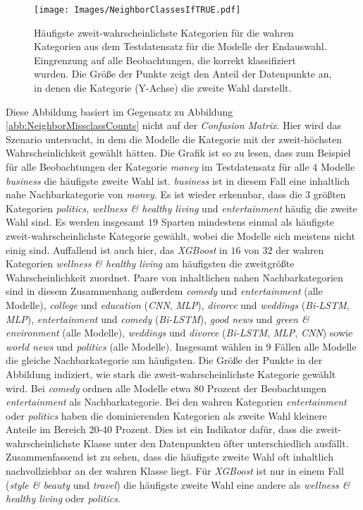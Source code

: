 \documentclass[a4paper,11pt]{article}
\begin{document}
\begin{figure}[ht]
    \centering
\texttt{[image: Images/NeighborClassesIfTRUE.pdf]} 
\caption{Häufigste zweit-wahrscheinlichste Kategorien für die wahren Kategorien aus dem Testdatensatz für die Modelle der Endauswahl. Eingrenzung auf alle Beobachtungen, die korrekt klassifiziert wurden. Die Größe der Punkte zeigt den Anteil der Datenpunkte an, in denen die Kategorie (Y-Achse) die zweite Wahl darstellt.}
\label{abb:NeighborClassesIfTRUE}
\end{figure}

Diese Abbildung basiert im Gegensatz zu Abbildung  \ref{abb:NeighborMissclassCounts} nicht auf der \textit{Confusion Matrix}. Hier wird das Szenario untersucht, in dem die Modelle die Kategorie mit der zweit-höchsten Wahrscheinlichkeit gewählt hätten. Die Grafik ist so zu lesen, dass zum Beispiel für alle Beobachtungen der Kategorie \textit{money} im Testdatensatz für alle $4$ Modelle \textit{business} die häufigste zweite Wahl ist. \textit{business} ist in diesem Fall eine inhaltlich nahe Nachbarkategorie von \textit{money}.
Es ist wieder erkennbar, dass die $3$ größten Kategorien \textit{politics}, \textit{wellness \& healthy living} und \textit{entertainment} häufig die zweite Wahl sind. Es werden insgesamt $19$ Sparten mindestens einmal als häufigste zweit-wahrscheinlichste Kategorie gewählt, wobei die Modelle sich meistens nicht einig sind. Auffallend ist auch hier, das \textit{XGBoost} in $16$ von $32$ der wahren Kategorien \textit{wellness \& healthy living} am häufigsten die zweitgrößte Wahrscheinlichkeit zuordnet. Paare von inhaltlichen nahen Nachbarkategorien sind in diesem Zusammenhang außerdem \textit{comedy} und \textit{entertainment} (alle Modelle),
\textit{college} und \textit{education} (\textit{CNN}, \textit{MLP}), \textit{divorce} und \textit{weddings} (\textit{Bi-LSTM}, \textit{MLP}), \textit{entertainment} und \textit{comedy} (\textit{Bi-LSTM}), \textit{good news} und \textit{green \& environment} (alle Modelle), \textit{weddings} und \textit{divorce} (\textit{Bi-LSTM}, \textit{MLP}, \textit{CNN}) sowie \textit{world news} und \textit{politics} (alle Modelle). Insgesamt wählen in $9$ Fällen alle Modelle die gleiche Nachbarkategorie am häufigsten. Die Größe der Punkte in der Abbildung indiziert, wie stark die zweit-wahrscheinlichste Kategorie gewählt wird. Bei \textit{comedy} ordnen alle Modelle etwa $80$ Prozent der Beobachtungen \textit{entertainment} als Nachbarkategorie. Bei den wahren Kategorien \textit{entertainment} oder \textit{politics} haben die dominierenden Kategorien als zweite Wahl kleinere Anteile im Bereich $20$-$40$ Prozent. Dies ist ein Indikator dafür, dass die zweit-wahrscheinlichste Klasse unter den Datenpunkten öfter unterschiedlich ausfällt. Zusammenfassend ist zu sehen, dass die häufigste zweite Wahl oft inhaltlich nachvollziehbar an der wahren Klasse liegt. Für \textit{XGBoost} ist nur in einem Fall (\textit{style \& beauty} und \textit{travel}) die häufigste zweite Wahl eine andere als \textit{wellness \& healthy living} oder \textit{politics}.\\
\\
\end{document}
